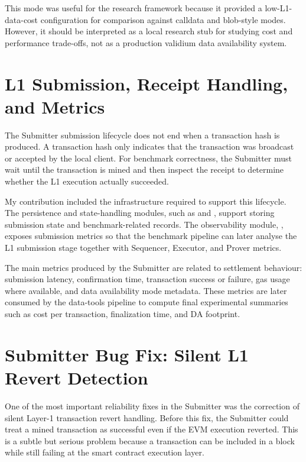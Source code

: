 This mode was useful for the research framework because it provided a low-L1-data-cost configuration for comparison against calldata and blob-style modes. However, it should be interpreted as a local research stub for studying cost and performance trade-offs, not as a production validium data availability system.

\section{L1 Submission, Receipt Handling, and Metrics}

The Submitter submission lifecycle does not end when a transaction hash is produced. A transaction hash only indicates that the transaction was broadcast or accepted by the local client. For benchmark correctness, the Submitter must wait until the transaction is mined and then inspect the receipt to determine whether the L1 execution actually succeeded.

My contribution included the infrastructure required to support this lifecycle. The persistence and state-handling modules, such as  and , support storing submission state and benchmark-related records. The observability module, , exposes submission metrics so that the benchmark pipeline can later analyse the L1 submission stage together with Sequencer, Executor, and Prover metrics.

The main metrics produced by the Submitter are related to settlement behaviour: submission latency, confirmation time, transaction success or failure, gas usage where available, and data availability mode metadata. These metrics are later consumed by the data-tools pipeline to compute final experimental summaries such as cost per transaction, finalization time, and DA footprint.

\section{Submitter Bug Fix: Silent L1 Revert Detection}

One of the most important reliability fixes in the Submitter was the correction of silent Layer-1 transaction revert handling. Before this fix, the Submitter could treat a mined transaction as successful even if the EVM execution reverted. This is a subtle but serious problem because a transaction can be included in a block while still failing at the smart contract execution layer.

